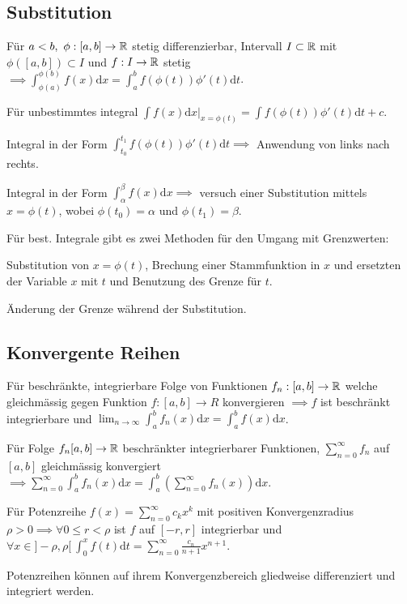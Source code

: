 \subsection{Substitution}
Für $a < b, \ \phi: [a, b] \to \mathbb{R}$ stetig differenzierbar, Intervall $I \subset \mathbb{R}$ mit $\phi([a,b]) \subset I$ und $f: I \to \mathbb{R}$ stetig $\implies \int_{\phi(a)}^{\phi(b)} f(x) \mathrm{d}x = \int_{a}^{b} f(\phi(t)) \phi'(t) \mathrm{d}t$.
\begin{compactitem}
    \item Für unbestimmtes integral $\int f(x) \mathrm{d}x |_{x=\phi(t)} = \int f(\phi(t))\phi'(t) \mathrm{d}t + c$.
    \item Integral in der Form $\int_{t_0}^{t_1} f(\phi(t))\phi'(t)\mathrm{d}t \implies$ Anwendung von links nach rechts.
    \item Integral in der Form $\int_{\alpha}^{\beta} f(x) \mathrm{d}x \implies$ versuch einer Substitution mittels $x = \phi(t)$, wobei $\phi(t_0) = \alpha$ und $\phi(t_1) = \beta$.
    \item Für best. Integrale gibt es zwei Methoden für den Umgang mit Grenzwerten:
        \begin{compactitem}
            \item Substitution von $x=\phi(t)$, Brechung einer Stammfunktion in $x$ und ersetzten der Variable $x$ mit $t$ und Benutzung des Grenze für $t$.
            \item Änderung der Grenze während der Substitution.
        \end{compactitem}
\end{compactitem}

\subsection{Konvergente Reihen}
\begin{compactitem}
    \item Für beschränkte, integrierbare Folge von Funktionen $f_n: [a,b] \to \mathbb{R}$ welche gleichmässig gegen Funktion $f:[a,b] \to R$ konvergieren $\implies f$ ist beschränkt integrierbare und $\lim_{n \to \infty} \int_{a}^{b} f_n(x) \mathrm{d}x = \int_{a}^{b} f(x) \mathrm{d}x$.
    \item Für Folge $f_n [a,b] \to \mathbb{R}$ beschränkter integrierbarer Funktionen, $\sum_{n=0}^{\infty} f_n$ auf $[a,b]$ gleichmässig konvergiert $\implies \sum_{n=0}^{\infty} \int_{a}^{b} f_n(x) \mathrm{d}x = \int_{a}^{b} \left( \sum_{n=0}^{\infty} f_n(x) \right) \mathrm{d}x$.
    \item Für Potenzreihe $f(x) = \sum_{n=0}^{\infty} c_kx^k$ mit positiven Konvergenzradius $\rho > 0 \implies \forall 0 \le r < \rho$ ist $f$ auf $[-r, r]$ integrierbar und $\forall x \in ]-\rho, \rho[ \ \int_{0}^{x} f(t) \mathrm{d}t = \sum_{n=0}^{\infty} \frac{c_n}{n + 1} x^{n+1}$.
        \begin{compactitem}
            \item Potenzreihen können auf ihrem Konvergenzbereich gliedweise differenziert und integriert werden.
        \end{compactitem}
\end{compactitem}

